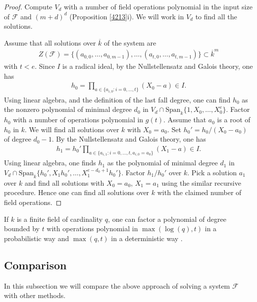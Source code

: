 \documentclass{amsart}
\theoremstyle{plain}
\theoremstyle{definition}
\begin{document}
\begin{proof}
Compute $V_d$ with a number of field operations polynomial in the input size of $\mathcal{F}$ and $(m+d)^d$ (Proposition \ref{4213}i). We will work in $V_d$ to find all the solutions.

Assume that all solutions over $\overline{k}$ of the system are
\begin{eqnarray*}
Z(\mathcal{F}) = \{(a_{0,0},\ldots,a_{0,m-1}), \ldots, (a_{t,0},\ldots,a_{t,m-1}) \} \subset \overline{k}^m
\end{eqnarray*}
with $t < e$.
Since $I$ is a radical ideal, by the Nullstellensatz and Galois theory, one has
\begin{eqnarray*}
h_0 = \prod_{a \in \{a_{i,0}: i=0,\ldots,t\}} (X_0-a) \in I.
\end{eqnarray*}
Using linear algebra, and the definition of the last fall degree, one can find $h_0$ as the nonzero polynomial of minimal degree $d_0$ in $V_d \cap \mathrm{Span}_{k}\{1,X_0,\ldots,X_0^e\}$.
Factor $h_0$ with a number of operations polynomial in $g(t)$. Assume that $a_0$ is a root of $h_0$ in $k$. We will find all solutions over $k$ with $X_0=a_0$. Set $h_0'=h_0/(X_0-a_0)$ of degree $d_0-1$.  By the Nullstellensatz and Galois theory, one has
\begin{eqnarray*}
h_1= h_0' \prod_{a \in \{a_{i,1}: i=0,\ldots,t, a_{i,0}=a_0 \}}  (X_1-a) \in I.
\end{eqnarray*}
Using linear algebra, one finds $h_1$ as the polynomial of minimal degree $d_1$ in $V_d \cap \mathrm{Span}_{k}\{h_0',X_1 h_0',\ldots,X_1^{e-d_0+1} h_0' \}$.
Factor $h_1/h_0'$ over $k$. Pick a solution $a_1$ over $k$ and find all solutions with $X_0=a_0$, $X_1=a_1$ using the similar recursive procedure. Hence one can find all solutions over $k$ with the claimed number of field operations.
\end{proof}

If $k$ is a finite field of cardinality $q$, one can factor a polynomial of degree bounded by $t$ with operations polynomial in  $\max(\log(q),t)$ in a probabilistic way and $\max(q,t)$ in a deterministic way \cite{GAT}.

\subsection{Comparison} \label{906}

In this subsection we will compare the above approach of solving a system $\mathcal{F}$ with other methods. 
\end{document}
